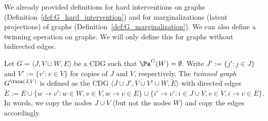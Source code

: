We already provided definitions for hard interventions on graphs (Definition~\ref{def:G_hard_intervention})
and for marginalizations (latent projections) of graphs (Definition~\ref{def:G_marginalization}). 
We can also define a twinning operation on graphs. We will only define this for graphs without bidirected edges.
\begin{Def}\label{def:G_twinning}
  Let $G=\langle J,V \cup W,E\rangle$ be a CDG such that $\Pa^G(W) = \emptyset$. Write $J' := \{j' : j \in J\}$
  and $V' := \{v' : v \in V\}$ for copies of $J$ and $V$, respectively.
  The \emph{twinned graph
  $G^{\twin(J,V)}$} is defined as the CDG $\langle J \dot\cup J', V \dot\cup V' \cup W, \tilde{E}\rangle$ with directed edges
  $$\tilde{E} := E \cup \{w \to v' : w \in W, v \in V, w \to v \in E\} \cup \{i' \to v' : i \in J \cup V, v \in V, i \to v \in E\}.$$
  In words, we copy the nodes $J \cup V$ (but not the nodes $W$) and copy the edges accordingly.
\end{Def}

